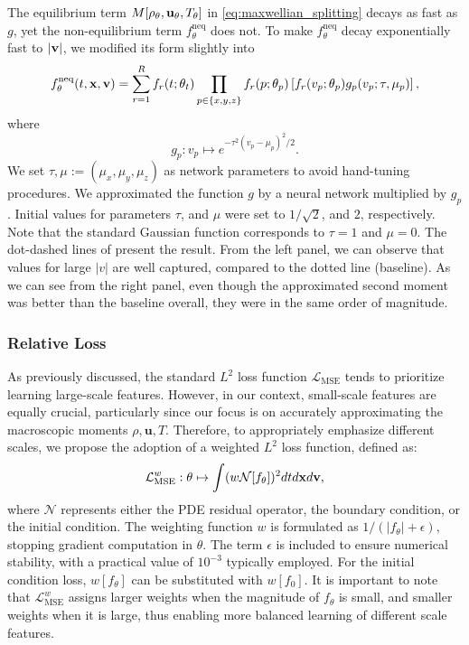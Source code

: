 \documentclass[preprint,12pt]{elsarticle}
\begin{document}
The equilibrium term $M[\rho_\theta, {\bf u}_\theta, T_\theta]$ in \eqref{eq:maxwellian_splitting} decays as fast as $g$,
yet the non-equilibrium term $f_\theta^\mathrm{neq}$ does not.
To make $f_\theta^\mathrm{neq}$ decay exponentially fast to $|{\bf v}|$, we modified its form slightly into 
\[
    f_\theta^\mathrm{neq}(t,{\bf x, v})
    = \sum_{r=1}^R  f_r(t;\theta_t) \prod_{p \in \{x,y,z\}} f_r(p;\theta_p) \left[ f_r(v_p;\theta_p) g_p(v_p; \tau, \mu_p) \right],
\]
where
\begin{equation}\label{eq:gaussian}
    g_p: v_p \mapsto e^{- \tau^2 (v_p - \mu_p)^2 / 2}.
\end{equation}
We set $\tau, \mu:= (\mu_x, \mu_y, \mu_z)$ as network parameters to avoid hand-tuning procedures.
We approximated the function $g$ by a neural network multiplied by $g_p$.
Initial values for parameters $\tau$, and $\mu$ were set to $1/\sqrt{2}$, and $2$, respectively.
Note that the standard Gaussian function corresponds to $\tau = 1$ and $\mu = 0$.
The dot-dashed lines of  present the result.
From the left panel, we can observe that values for large $|v|$ are well captured, compared to the dotted line (baseline).
As we can see from the right panel, even though the approximated second moment was better than the baseline overall, they were in the same order of magnitude.


\subsubsection{Relative Loss}\label{sec:relative_loss}
As previously discussed, the standard $L^2$ loss function \(\mathcal{L}_\mathrm{MSE}\) tends to prioritize learning large-scale features.
However, in our context, small-scale features are equally crucial, particularly since our focus is on accurately approximating the macroscopic moments \(\rho, \mathbf{u}, T\).
Therefore, to appropriately emphasize different scales, we propose the adoption of a weighted \(L^2\) loss function, defined as:
\begin{equation}\label{eq:relative_loss}
    \mathcal{L}_\mathrm{MSE}^w: \theta \mapsto \int (w \mathcal{N}[f_\theta] )^2 dtd{\bf x}d{\bf v},
\end{equation}
where $\mathcal{N}$ represents either the PDE residual operator, the boundary condition, or the initial condition.
The weighting function $w$ is formulated as $1 / (|f_\theta| + \epsilon)$, stopping gradient computation in $\theta$.
The term $\epsilon$ is included to ensure numerical stability, with a practical value of $10^{-3}$ typically employed. For the initial condition loss, $w[f_\theta]$ can be substituted with $w[f_0]$.
It is important to note that $\mathcal{L}_\mathrm{MSE}^w$ assigns larger weights when the magnitude of $f_\theta$ is small, and smaller weights when it is large, thus enabling more balanced learning of different scale features.
\end{document}
